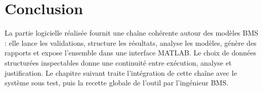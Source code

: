 \section{Conclusion}
\label{sec:ch5_conclusion}

La partie logicielle réalisée fournit une chaîne cohérente autour des modèles BMS : elle lance les validations, structure les résultats, analyse les modèles, génère des rapports et expose l'ensemble dans une interface MATLAB. Le choix de données structurées inspectables donne une continuité entre exécution, analyse et justification. Le chapitre suivant traite l'intégration de cette chaîne avec le système sous test, puis la recette globale de l'outil par l'ingénieur BMS.
